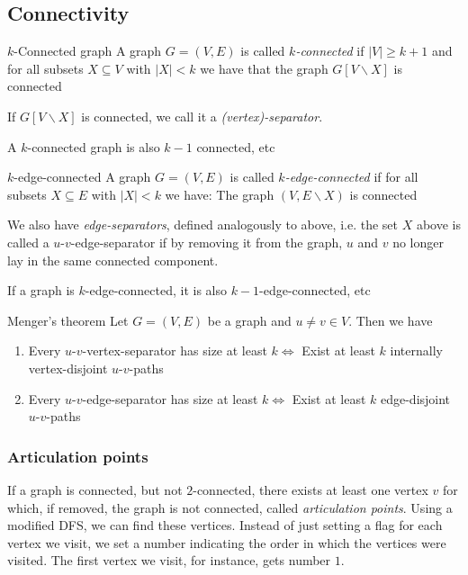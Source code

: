 \setcounter{subsection}{3}
\subsection{Connectivity}
\setcounter{all}{23}
\begin{definition}[]{$k$-Connected graph}
    A graph $G = (V, E)$ is called $k$\textit{-connected} if $|V| \geq k + 1$ and for all subsets $X \subseteq V$ with $|X| < k$ we have that the graph $G[V\backslash X]$ is connected
\end{definition}
If $G[V\backslash X]$ is  connected, we call it a \textit{(vertex)-separator}.

A $k$-connected graph is also $k - 1$ connected, etc

\begin{definition}[]{$k$-edge-connected}
    A graph $G = (V, E)$ is called $k$\textit{-edge-connected} if for all subsets $X \subseteq E$ with $|X| < k$ we have: The graph $(V, E\backslash X)$ is connected
\end{definition}
We also have \textit{edge-separators}, defined analogously to above, i.e. the set $X$ above is called a $u$-$v$-edge-separator if by removing it from the graph, $u$ and $v$ no longer lay in the same connected component.

If a graph is $k$-edge-connected, it is also $k - 1$-edge-connected, etc


\begin{theorem}[]{Menger's theorem}
    Let $G = (V, E)$ be a graph and $u \neq v \in V$. Then we have
    \begin{enumerate}
        \item Every $u$-$v$-vertex-separator has size at least $k \Leftrightarrow$ Exist at least $k$ internally vertex-disjoint $u$-$v$-paths
        \item Every $u$-$v$-edge-separator has size at least $k \Leftrightarrow$ Exist at least $k$ edge-disjoint $u$-$v$-paths
    \end{enumerate}
\end{theorem}


\newpage
\subsubsection{Articulation points}
If a graph is connected, but not $2$-connected, there exists at least one vertex $v$ for which, if removed, the graph is not connected, called \textit{articulation points}. Using a modified DFS, we can find these vertices. Instead of just setting a flag for each vertex we visit, we set a number indicating the order in which the vertices were visited. The first vertex we visit, for instance, gets number $1$.

